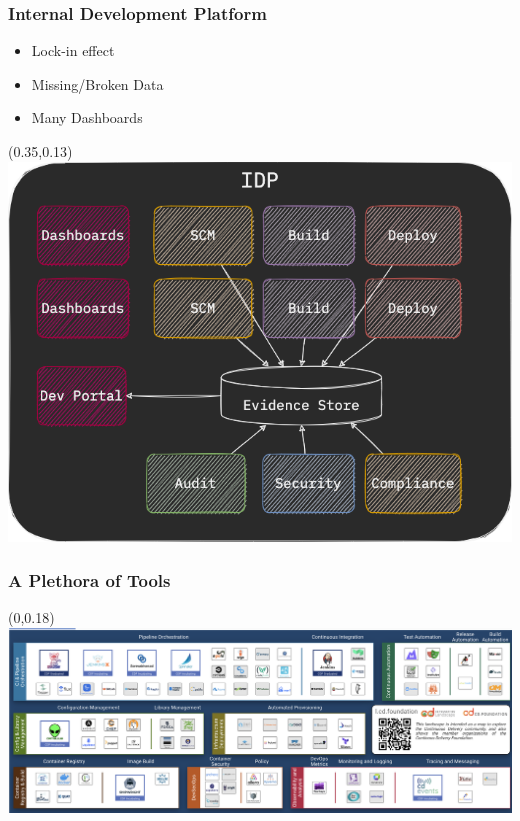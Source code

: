 \documentclass[aspectratio=169,11pt,hyperref={colorlinks=true}]{beamer}
\begin{document}
\begin{blackframe}
  \frametitle{Internal Development Platform}
  \begin{itemize}
    \item Lock-in effect
    \item Missing/Broken Data
    \item Many Dashboards
  \end{itemize}
  \begin{textblock*}{0.60\paperwidth}(0.35\paperwidth,0.13\paperheight)
    \includegraphics[width=0.60\paperwidth]{img/cdevents-idp-multiple.png}
  \end{textblock*}
\end{blackframe}

\begin{grayframe}
  \frametitle{A Plethora of Tools}
  \begin{textblock*}{1.0\paperwidth}(0\paperwidth,0.18\paperheight)
    \includegraphics[width=1.0\paperwidth]{img/landscape.cd.foundation.png}
  \end{textblock*}
\end{grayframe}
\end{document}
